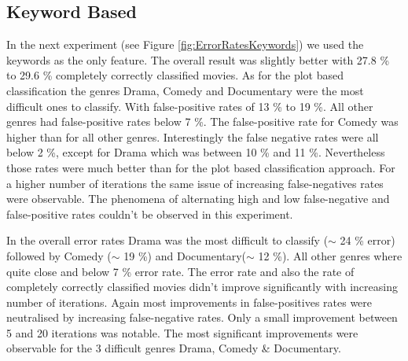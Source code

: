 \documentclass{vldb}
\begin{document}
\subsection{Keyword Based}
\par In the next experiment (see Figure \ref{fig:ErrorRatesKeywords})  we used the keywords as the only feature. The overall result was slightly better with 27.8 \% to 29.6 \% completely correctly classified movies.
As for the plot based classification the genres Drama, Comedy and Documentary were the most difficult  ones to classify. With false-positive rates of 13 \% to 19 \%. All other genres had false-positive rates below 7 \%. 
The false-positive rate for Comedy was higher than for all other genres. Interestingly the false negative rates were all below 2 \%, except for Drama which was between 10 \% and 11 \%. Nevertheless those rates were much better than for the plot based classification approach. For a higher number of iterations the same issue of increasing false-negatives rates were observable. The phenomena of alternating high and low false-negative and false-positive rates couldn't be observed in this experiment.
\par In the overall error rates Drama was the most difficult to classify ($\sim$ 24 \% error) followed by Comedy ($\sim$ 19 \%) and Documentary($\sim$ 12 \%). All other genres where quite close and below 7 \% error rate. The error rate and also the rate of completely correctly classified movies didn't improve significantly with increasing number of iterations. Again most improvements in false-positives rates were neutralised by increasing false-negative rates. Only a small improvement between 5 and 20 iterations was notable. The most significant improvements were observable for the 3 difficult genres Drama, Comedy \& Documentary.
\end{document}
